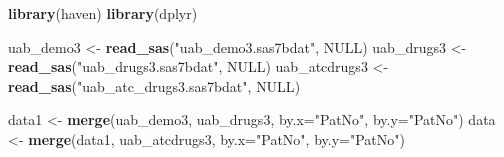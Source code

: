 \documentclass[
]{article}
\newenvironment{Shaded}{\begin{snugshade}}{\end{snugshade}}
\newcommand{\AttributeTok}[1]{\textcolor[rgb]{0.13,0.29,0.53}{#1}}
\newcommand{\ConstantTok}[1]{\textcolor[rgb]{0.56,0.35,0.01}{#1}}
\newcommand{\FunctionTok}[1]{\textcolor[rgb]{0.13,0.29,0.53}{\textbf{#1}}}
\newcommand{\NormalTok}[1]{#1}
\newcommand{\OtherTok}[1]{\textcolor[rgb]{0.56,0.35,0.01}{#1}}
\newcommand{\StringTok}[1]{\textcolor[rgb]{0.31,0.60,0.02}{#1}}
\begin{document}
\begin{Shaded}
\begin{Highlighting}[]
\FunctionTok{library}\NormalTok{(haven)}
\FunctionTok{library}\NormalTok{(dplyr)}

\NormalTok{uab\_demo3 }\OtherTok{\textless{}{-}} \FunctionTok{read\_sas}\NormalTok{(}\StringTok{"uab\_demo3.sas7bdat"}\NormalTok{, }\ConstantTok{NULL}\NormalTok{)}
\NormalTok{uab\_drugs3 }\OtherTok{\textless{}{-}} \FunctionTok{read\_sas}\NormalTok{(}\StringTok{"uab\_drugs3.sas7bdat"}\NormalTok{, }\ConstantTok{NULL}\NormalTok{)}
\NormalTok{uab\_atcdrugs3 }\OtherTok{\textless{}{-}} \FunctionTok{read\_sas}\NormalTok{(}\StringTok{"uab\_atc\_drugs3.sas7bdat"}\NormalTok{, }\ConstantTok{NULL}\NormalTok{)}

\NormalTok{data1 }\OtherTok{\textless{}{-}} \FunctionTok{merge}\NormalTok{(uab\_demo3, uab\_drugs3, }\AttributeTok{by.x=}\StringTok{"PatNo"}\NormalTok{, }\AttributeTok{by.y=}\StringTok{"PatNo"}\NormalTok{)}
\NormalTok{data }\OtherTok{\textless{}{-}} \FunctionTok{merge}\NormalTok{(data1, uab\_atcdrugs3, }\AttributeTok{by.x=}\StringTok{"PatNo"}\NormalTok{, }\AttributeTok{by.y=}\StringTok{"PatNo"}\NormalTok{)}


\end{Highlighting}
\end{Shaded}
\end{document}
